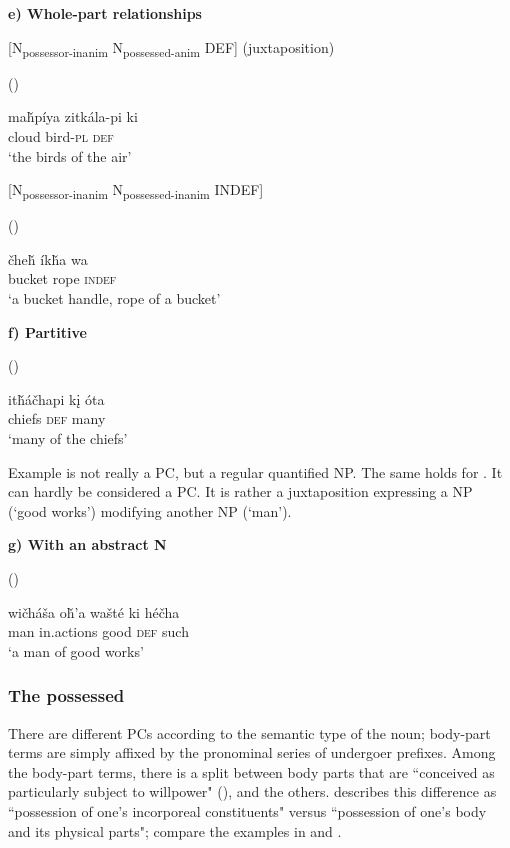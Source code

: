 \documentclass[output=paper]{LSP/langsci}
\begin{document}
\vspace{1em}
\textbf{e)	Whole-part relationships}

[N\textsubscript{possessor-inanim} N\textsubscript{possessed-anim} DEF] (juxtaposition)

\ea {} (\citealt[92]{Buechel1939})

\gll ma\v{h}píya zitkála-pi  ki  \\
cloud      bird-\textsc{pl} \textsc{def} \\
\glt `the birds of the air'
\z

[N\textsubscript{possessor-inanim} N\textsubscript{possessed-inanim} INDEF] 

\ea {} (\citealt[92]{Buechel1939})

\gll  \v{c}he\v{h} \'ik\v{h}a wa \\  
bucket rope \textsc{indef} \\
\glt `a bucket handle, rope of a bucket' 
\z 

\textbf{f)	Partitive}

\ea {} (\citealt[93]{Buechel1939}) \label{lakotamanychiefs}

\gll it\v{h}\'a\v{c}hapi k\k{i} \'ota \\
chiefs \textsc{def} many \\
\glt `many of the chiefs'
\z

Example  is not really a PC, but a regular quantified NP. The same holds for . It can hardly be considered a PC. It is rather a juxtaposition expressing a NP (`good works') modifying another NP (`man').

\vspace{1em}

\textbf{g)	With an abstract  N}

\ea {} (\citealt[93]{Buechel1939}) \label{lakotagoodworks}

\gll wi\v{c}háša o\v{h}'a     wašté ki     hé\v{c}ha \\
man       in.actions good  \textsc{def} such \\
\glt `a man of good works'
\z

\subsubsection{The possessed}
There are different PCs according to the semantic type of the  noun; body-part terms are simply affixed by the pronominal series of undergoer prefixes. Among the body-part terms, there is a split between body parts that are ``conceived as particularly subject to willpower" (\citealt[128]{BoasDeloria1941}), and the others. \citet[100]{Buechel1939} describes this difference as ``possession of one's incorporeal constituents" versus ``possession of one's body and its physical parts"; compare the examples in  and .
\end{document}
